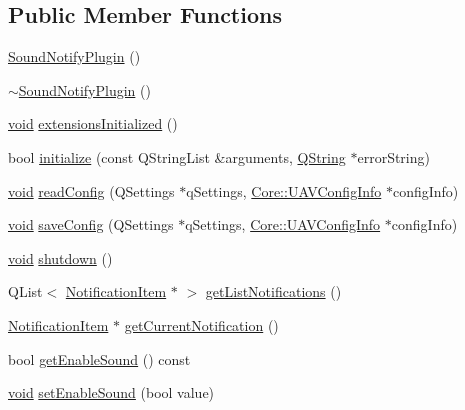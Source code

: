 \subsection*{\-Public \-Member \-Functions}
\begin{DoxyCompactItemize}
\item 
\hyperlink{group___notify_plugin_ga4ac47c6cde68d633ead0764296f9a737}{\-Sound\-Notify\-Plugin} ()
\item 
\hyperlink{group___notify_plugin_ga41104bb06fbf94801a798514294d39c3}{$\sim$\-Sound\-Notify\-Plugin} ()
\item 
\hyperlink{group___u_a_v_objects_plugin_ga444cf2ff3f0ecbe028adce838d373f5c}{void} \hyperlink{group___notify_plugin_gad704ab0c43392e54f01882f7883f689f}{extensions\-Initialized} ()
\item 
bool \hyperlink{group___notify_plugin_ga5c84bbeb8237b65ecce93f518a26384d}{initialize} (const \-Q\-String\-List \&arguments, \hyperlink{group___u_a_v_objects_plugin_gab9d252f49c333c94a72f97ce3105a32d}{\-Q\-String} $\ast$error\-String)
\item 
\hyperlink{group___u_a_v_objects_plugin_ga444cf2ff3f0ecbe028adce838d373f5c}{void} \hyperlink{group___notify_plugin_gae783274f70106d7f8a50f51b4d98221f}{read\-Config} (\-Q\-Settings $\ast$q\-Settings, \hyperlink{class_core_1_1_u_a_v_config_info}{\-Core\-::\-U\-A\-V\-Config\-Info} $\ast$config\-Info)
\item 
\hyperlink{group___u_a_v_objects_plugin_ga444cf2ff3f0ecbe028adce838d373f5c}{void} \hyperlink{group___notify_plugin_ga591d270cfaee4d5107899bf24ac83289}{save\-Config} (\-Q\-Settings $\ast$q\-Settings, \hyperlink{class_core_1_1_u_a_v_config_info}{\-Core\-::\-U\-A\-V\-Config\-Info} $\ast$config\-Info)
\item 
\hyperlink{group___u_a_v_objects_plugin_ga444cf2ff3f0ecbe028adce838d373f5c}{void} \hyperlink{group___notify_plugin_ga2f91d9771233415fa6d23a8087331df9}{shutdown} ()
\item 
\-Q\-List$<$ \hyperlink{class_notification_item}{\-Notification\-Item} $\ast$ $>$ \hyperlink{group___notify_plugin_ga949c06b617fbadfd2c844d9f29351085}{get\-List\-Notifications} ()
\item 
\hyperlink{class_notification_item}{\-Notification\-Item} $\ast$ \hyperlink{group___notify_plugin_ga286a323009d17d90a51abfbc288bdc68}{get\-Current\-Notification} ()
\item 
bool \hyperlink{group___notify_plugin_ga25e91be7ff9c99dcb12a2e0931cec530}{get\-Enable\-Sound} () const 
\item 
\hyperlink{group___u_a_v_objects_plugin_ga444cf2ff3f0ecbe028adce838d373f5c}{void} \hyperlink{group___notify_plugin_ga25cf9833d9cea621e4168a81ee0e9d05}{set\-Enable\-Sound} (bool value)
\end{DoxyCompactItemize}


